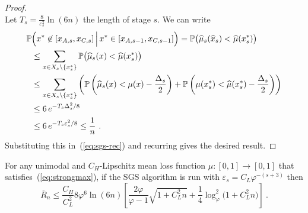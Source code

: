 \documentclass[11pt]{hackednow}
\renewcommand{\phi}{\varphi}
\renewcommand{\P}{\mathbb{P}}
\newcommand{\oR}{\overline{R}}
\newcommand{\wh}{\widehat}
\newcommand{\ve}{\varepsilon}
\newcommand{\xhat}{\wh{x}}
\newcommand{\muhat}{\wh{\mu}}
\begin{document}
\begin{proof}
\[\]
Let $T_s = \tfrac{8}{\ve_s^2}\ln(6n)$ the length of stage $s$. We can write
\begin{align*}
    \P&\Bigl(x^* \not\in [x_{A,s},x_{C,s}] \,\Big|\, x^* \in [x_{A,s-1},x_{C,s-1}]\Bigr)
=
    \P\bigl(\muhat_s(\xhat_s) < \muhat(x^*_s)\bigr)
\\ &\le
    \sum_{x \in X_s\setminus\{x^*_s\}}\P\bigl(\muhat_s(x) < \muhat(x^*_s)\bigr)
\\ &\le
    \sum_{x \in X_s\setminus\{x^*_s\}}\left( \P\left(\muhat_s(x) < \mu(x) - \frac{\Delta_s}{2}\right) + \P\left(\mu(x^*_s) < \muhat(x^*_s) - \frac{\Delta_s}{2}\right)\right)
\\ &\le
    6\,e^{-T_s\Delta_s^2/8} 
\\ &\le
    6\,e^{-T_s\ve_s^2/8} 
\le
    \frac{1}{n}~.
\end{align*}
Substituting this in~(\ref{eq:sgs-rec}) and recurring gives the desired result.
\end{proof}
%
\begin{theorem}
For any unimodal and $C_H$-Lipschitz mean loss function $\mu : [0,1] \to [0,1]$ that satisfies~(\ref{eq:strongmax}),
if the SGS algorithm is run with $\ve_s = C_L\varphi^{-(s+3)}$ then
\[
    \oR_n \le \frac{C_H}{C_L^2}8\varphi^6\ln(6n) \left[ \frac{2\varphi}{\varphi-1}\sqrt{1 + C_L^2 n} + \frac{1}{4}\log_{\phi}^2\bigl(1 + C_L^2 n\bigr) \right]~.
\]
\end{theorem}
%
\end{document}
